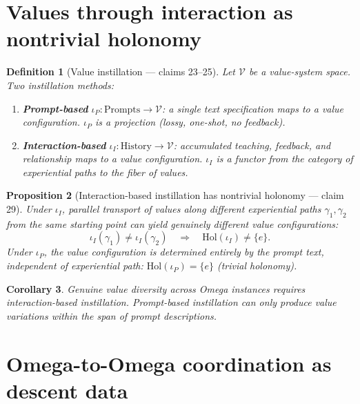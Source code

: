 \documentclass[11pt,a4paper]{article}
\newtheorem{definition}{Definition}[section]
\newtheorem{proposition}[definition]{Proposition}
\newtheorem{corollary}[definition]{Corollary}
\begin{document}
\section{Values through interaction as nontrivial holonomy}
\label{sec:values-holonomy}

\begin{definition}[Value instillation --- claims 23--25]
\label{def:value-instill}
Let $\mathcal{V}$ be a value-system space. Two instillation methods:
\begin{enumerate}
\item \textbf{Prompt-based} $\iota_P : \text{Prompts} \to \mathcal{V}$:
  a single text specification maps to a value configuration.
  $\iota_P$ is a projection (lossy, one-shot, no feedback).
\item \textbf{Interaction-based} $\iota_I : \text{History} \to \mathcal{V}$:
  accumulated teaching, feedback, and relationship maps to a value
  configuration. $\iota_I$ is a functor from the category of
  experiential paths to the fiber of values.
\end{enumerate}
\end{definition}

\begin{proposition}[Interaction-based instillation has nontrivial holonomy --- claim 29]
\label{prop:value-holonomy}
Under $\iota_I$, parallel transport of values along different
experiential paths $\gamma_1, \gamma_2$ from the same starting point
can yield genuinely different value configurations:
\[
  \iota_I(\gamma_1) \neq \iota_I(\gamma_2)
  \quad \Rightarrow \quad
  \text{Hol}(\iota_I) \neq \{e\}.
\]
Under $\iota_P$, the value configuration is determined entirely by the
prompt text, independent of experiential path: $\text{Hol}(\iota_P) = \{e\}$
(trivial holonomy).
\end{proposition}

\begin{corollary}
Genuine value diversity across Omega instances requires interaction-based
instillation. Prompt-based instillation can only produce value variations
within the span of prompt descriptions.
\end{corollary}

\section{Omega-to-Omega coordination as descent data}
\label{sec:descent}
\end{document}
